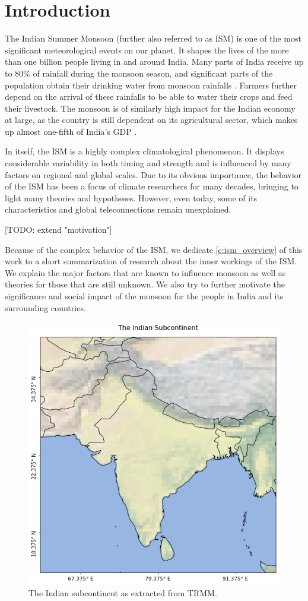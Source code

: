 \chapter{Introduction}
\label{c:introduction}

The Indian Summer Monsoon (further also referred to as ISM) is one of the most significant meteorological events on our planet. It shapes the lives of the more than one billion people living in and around India. Many parts of India receive up to 80\% of rainfall during the monsoon season, and significant parts of the population obtain their drinking water from monsoon rainfalls \citep{Stolbova.2015}. Farmers further depend on the arrival of these rainfalls to be able to water their crops and feed their livestock. The monsoon is of similarly high impact for the Indian economy at large, as the country is still dependent on its agricultural sector, which makes up almost one-fifth of India's GDP \citep{CentralIntelligenceAgency.05.01.2018}.

In itself, the ISM is a highly complex climatological phenomenon. It displays considerable variability in both timing and strength and is influenced by many factors on regional and global scales. Due to its obvious importance, the behavior of the ISM has been a focus of climate researchers for many decades, bringing to light many theories and hypotheses. However, even today, some of its characteristics and global teleconnections remain unexplained.

[TODO: extend "motivation"]

Because of the complex behavior of the ISM, we dedicate \cref{c:ism_overview} of this work to a short summarization of research about the inner workings of the ISM. We explain the major factors that are known to influence monsoon as well as theories for those that are still unknown. We also try to further motivate the significance and social impact of the monsoon for the people in India and its surrounding countries.

\begin{figure}[h]
  \centering
  \includegraphics[width=0.5\linewidth]{./99_appendix/img/area_overview}
  \caption{The Indian subcontinent as extracted from TRMM.}
  \label{fig:trmm_area}
\end{figure}

